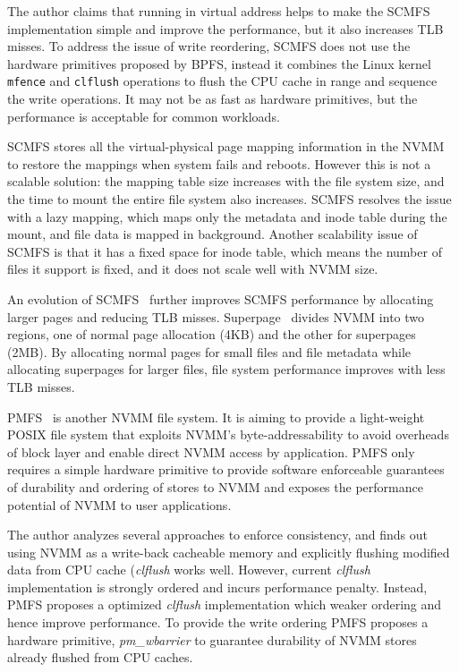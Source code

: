 The author claims that running in virtual address helps to make the SCMFS
implementation simple and improve the performance, but it also increases
TLB misses. To address the issue of write reordering, SCMFS does not use the
hardware primitives proposed by BPFS, instead it combines the Linux kernel
\texttt{mfence} and \texttt{clflush} operations to flush the CPU cache in
range and sequence the write operations. It may not be as fast as hardware
primitives, but the performance is acceptable for common workloads.

SCMFS stores all the virtual-physical page mapping information in the NVMM
to restore the mappings when system fails and reboots. However this is not
a scalable solution: the mapping table size increases with the file system
size, and the time to mount the entire file system also increases. SCMFS
resolves the issue with a lazy mapping, which maps only the metadata and inode
table during the mount, and file data is mapped in background.
Another scalability issue of SCMFS is that it has a fixed space for inode table,
which means the number of files it support is fixed, and it does not scale
well with NVMM size.

An evolution of SCMFS~\cite{superpage} further improves SCMFS performance
by allocating larger pages and reducing TLB misses. Superpage~\cite{superpage}
divides NVMM into two regions, one of normal page allocation (4KB) and the other
for superpages (2MB). By allocating normal pages for small files and file 
metadata while allocating superpages for larger files, file system performance
improves with less TLB misses.



PMFS~\cite{PMFS} is another NVMM file system. It is aiming to provide a
light-weight POSIX file system that exploits NVMM's byte-addressability to
avoid overheads of block layer and enable direct NVMM access by application.
PMFS only requires a simple hardware primitive to provide software enforceable
guarantees of durability and ordering of stores to NVMM and exposes the 
performance potential of NVMM to user applications.

The author analyzes several approaches to enforce consistency, and finds out
using NVMM as a write-back cacheable memory and explicitly flushing modified
data from CPU cache (\emph{clflush} works well. However, current \emph{clflush}
implementation is strongly ordered and incurs performance penalty. Instead,
PMFS proposes a optimized \emph{clflush} implementation which weaker ordering
and hence improve performance. To provide the write ordering PMFS proposes
a hardware primitive, \emph{pm\_wbarrier} to guarantee durability of NVMM stores
already flushed from CPU caches.

